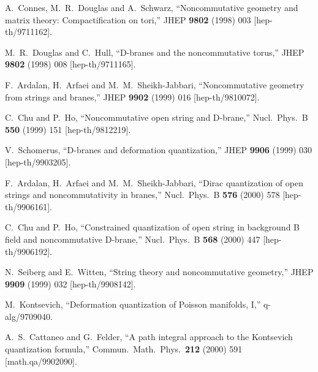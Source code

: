 \documentclass[a4paper,12pt]{article}
\begin{document}
\newpage


A.~Connes, M.~R.~Douglas and A.~Schwarz,
``Noncommutative geometry and matrix theory: Compactification on tori,''
JHEP {\bf 9802} (1998) 003
[hep-th/9711162].

M.~R.~Douglas and C.~Hull,
``D-branes and the noncommutative torus,''
JHEP {\bf 9802} (1998) 008
[hep-th/9711165].

F.~Ardalan, H.~Arfaei and M.~M.~Sheikh-Jabbari,
``Noncommutative geometry from strings and branes,''
JHEP {\bf 9902} (1999) 016
[hep-th/9810072].

C.~Chu and P.~Ho,
``Noncommutative open string and D-brane,''
Nucl.\ Phys.\ B {\bf 550} (1999) 151
[hep-th/9812219].

V.~Schomerus,
``D-branes and deformation quantization,''
JHEP {\bf 9906} (1999) 030
[hep-th/9903205].

F.~Ardalan, H.~Arfaei and M.~M.~Sheikh-Jabbari,
``Dirac quantization of open strings and noncommutativity in branes,''
Nucl.\ Phys.\ B {\bf 576} (2000) 578
[hep-th/9906161].

C.~Chu and P.~Ho,
``Constrained quantization of open string in background B field and  
noncommutative D-brane,''
Nucl.\ Phys.\ B {\bf 568} (2000) 447
[hep-th/9906192].

N.~Seiberg and E.~Witten,
``String theory and noncommutative geometry,''
JHEP {\bf 9909} (1999) 032
[hep-th/9908142].

M.~Kontsevich,
``Deformation quantization of Poisson manifolds, I,''
q-alg/9709040.

A.~S.~Cattaneo and G.~Felder,
``A path integral approach to the Kontsevich quantization formula,''
Commun.\ Math.\ Phys.\  {\bf 212} (2000) 591
[math.qa/9902090].
\end{document}
